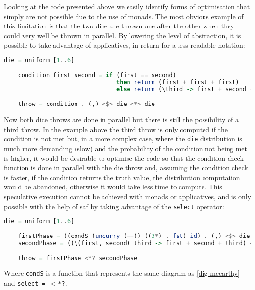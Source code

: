 \documentclass[
  oneside,
  11pt, a4paper,
  footinclude=true,
  headinclude=true,
  cleardoublepage=empty
]{scrbook}
\theoremstyle{definition}
\theoremstyle{definition}
\begin{document}
    Looking at the code presented above we easily identify forms of optimisation that simply are not possible due to the use of monads. The most obvious example of this limitation is that the two dice are thrown one after the other when they could very well be thrown in parallel. By lowering the level of abstraction, it is possible to take advantage of applicatives, in return for a less readable notation:
			
    \begin{lstlisting}[language=Haskell, caption={Applicative dice throw},captionpos=b]
    die = uniform [1..6]
                
    condition first second = if (first == second)
                                then return (first + first + first)
                                else return (\third -> first + second + third) <*> die
                                
    throw = condition . (,) <$> die <*> die
    \end{lstlisting}{}
    
    Now both dice throws are done in parallel but there is still the possibility of a third throw. In the example above the third throw is only computed if the condition is not met but, in a more complex case, where the \texttt{die} distribution is much more demanding (slow) and the probability of the condition not being met is higher, it would be desirable to optimise the code so that the condition check function is done in parallel with the die throw and, assuming the condition check is faster, if the condition returns the truth value, the distribution computation would be abandoned, otherwise it would take less time to compute. This speculative execution cannot be achieved with monads or applicatives, and is only possible with the help of \gls{saf} by taking advantage of the \texttt{select} operator:
    
    \begin{lstlisting}[language=Haskell, caption={Selective dice throw},captionpos=b]
    die = uniform [1..6]
    
    firstPhase = ((condS (uncurry (==)) ((3*) . fst) id) . (,) <$> die <*> die)
    secondPhase = ((\(first, second) third -> first + second + third) <*> die)
                
    throw = firstPhase <*? secondPhase
    \end{lstlisting}{}
    
    Where \texttt{condS} is a function that represents the same diagram as \ref{dig-mccarthy} and \texttt{select = $<$*?}.
    
\end{document}
